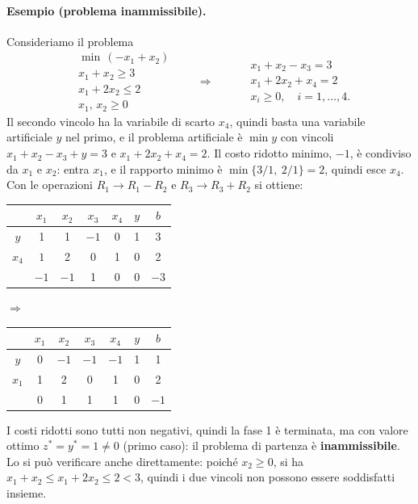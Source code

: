 \paragraph{Esempio (problema inammissibile).}
Consideriamo il problema
\[
\begin{aligned}
&\min\, (-x_1 + x_2) \\
&x_1 + x_2 \ge 3 \\
&x_1 + 2x_2 \le 2 \\
&x_1,\, x_2 \ge 0
\end{aligned}
\qquad\Longrightarrow\qquad
\begin{aligned}
&x_1 + x_2 - x_3 = 3 \\
&x_1 + 2x_2 + x_4 = 2 \\
&x_i \ge 0, \quad i = 1, \dots, 4.
\end{aligned}
\]
Il secondo vincolo ha la variabile di scarto $x_4$, quindi basta una variabile artificiale $y$ nel primo, e il problema artificiale è $\min y$ con vincoli $x_1 + x_2 - x_3 + y = 3$ e $x_1 + 2x_2 + x_4 = 2$. Il costo ridotto minimo, $-1$, è condiviso da $x_1$ e $x_2$: entra $x_1$, e il rapporto minimo è $\min\{3/1,\ 2/1\} = 2$, quindi esce $x_4$. Con le operazioni $R_1 \to R_1 - R_2$ e $R_3 \to R_3 + R_2$ si ottiene:
\begin{center}
\begin{tabular}{c|ccccc|c}
 & $x_1$ & $x_2$ & $x_3$ & $x_4$ & $y$ & $b$ \\
\hline
$y$ & 1 & 1 & $-1$ & 0 & 1 & 3 \\
$x_4$ & $\boxed{1}$ & 2 & 0 & 1 & 0 & 2 \\
\hline
 & $-1$ & $-1$ & 1 & 0 & 0 & $-3$ \\
\end{tabular}
\qquad$\Longrightarrow$\qquad
\begin{tabular}{c|ccccc|c}
 & $x_1$ & $x_2$ & $x_3$ & $x_4$ & $y$ & $b$ \\
\hline
$y$ & 0 & $-1$ & $-1$ & $-1$ & 1 & 1 \\
$x_1$ & 1 & 2 & 0 & 1 & 0 & 2 \\
\hline
 & 0 & 1 & 1 & 1 & 0 & $-1$ \\
\end{tabular}
\end{center}
I costi ridotti sono tutti non negativi, quindi la fase 1 è terminata, ma con valore ottimo $z^* = y^* = 1 \neq 0$ (primo caso): il problema di partenza è \textbf{inammissibile}. Lo si può verificare anche direttamente: poiché $x_2 \ge 0$, si ha $x_1 + x_2 \le x_1 + 2x_2 \le 2 < 3$, quindi i due vincoli non possono essere soddisfatti insieme.

